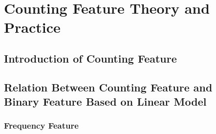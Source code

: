 \documentclass{sig-alternate}
\begin{document}
\section{Counting Feature Theory and Practice}
\subsection{Introduction of Counting Feature}
\subsection{Relation Between Counting Feature and Binary Feature Based on Linear Model}
\subsubsection{Frequency Feature}
\setlength{\parindent}{5ex}
\end{document}
